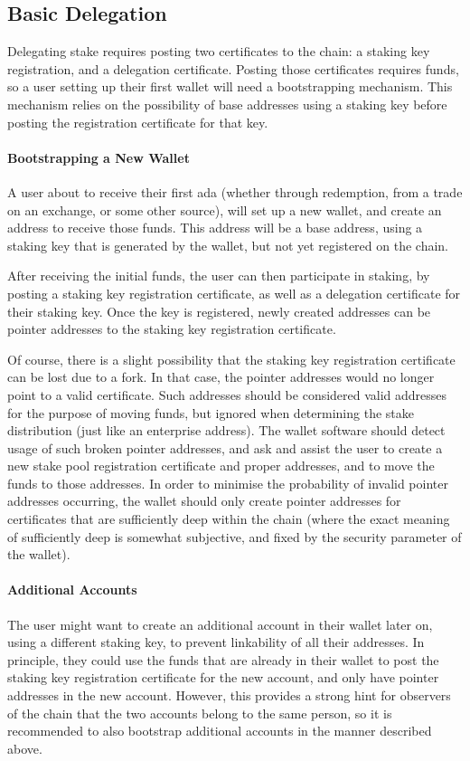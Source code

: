 \documentclass[11pt,a4paper,dvipsnames,twosided]{article}
\begin{document}
\subsection{Basic Delegation}
\label{basic-delegation}

Delegating stake requires posting two certificates to the chain: a
staking key registration, and a delegation certificate. Posting those
certificates requires funds, so a user setting up their first wallet
will need a bootstrapping mechanism. This mechanism relies on the
possibility of base addresses using a staking key before posting the
registration certificate for that key.

\paragraph{Bootstrapping a New Wallet}
A user about to receive their first ada (whether through redemption,
from a trade on an exchange, or some other source), will set up a new
wallet, and create an address to receive those funds. This address
will be a base address, using a staking key that is generated by the
wallet, but not yet registered on the chain.

After receiving the initial funds, the user can then participate in
staking, by posting a staking key registration certificate, as well as a
delegation certificate for their staking key. Once the key is
registered, newly created addresses can be pointer addresses to the
staking key registration certificate.

Of course, there is a slight possibility that the staking key
registration certificate can be lost due to a fork. In that case, the
pointer addresses would no longer point to a valid certificate. Such
addresses should be considered valid addresses for the purpose of
moving funds, but ignored when determining the stake distribution
(just like an enterprise address). The wallet software should detect
usage of such broken pointer addresses, and ask and assist the user to
create a new stake pool registration certificate and proper addresses,
and to move the funds to those addresses. In order to minimise the
probability of invalid pointer addresses occurring, the wallet should
only create pointer addresses for certificates that are sufficiently
deep within the chain (where the exact meaning of sufficiently deep is
somewhat subjective, and fixed by the security parameter of the
wallet).

\paragraph{Additional Accounts}
The user might want to create an additional account in their wallet
later on, using a different staking key, to prevent linkability of all
their addresses. In principle, they could use the funds that are
already in their wallet to post the staking key registration certificate
for the new account, and only have pointer addresses in the new
account. However, this provides a strong hint for observers of the
chain that the two accounts belong to the same person, so it is
recommended to also bootstrap additional accounts in the manner
described above.
\end{document}
